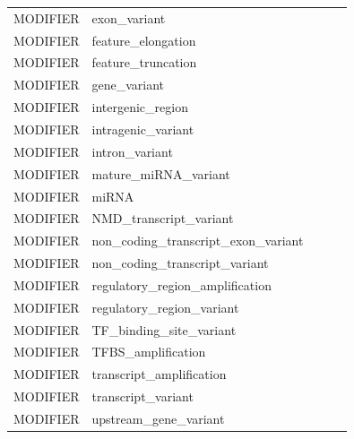 \begin{table}[]
{\begin{tabular}{|l|l|lll}
MODIFIER                       & exon\_variant                                        &  &  &  \\ \cline{1-2}
MODIFIER                       & feature\_elongation                                  &  &  &  \\ \cline{1-2}
MODIFIER                       & feature\_truncation                                  &  &  &  \\ \cline{1-2}
MODIFIER                       & gene\_variant                                        &  &  &  \\ \cline{1-2}
MODIFIER                       & intergenic\_region                                   &  &  &  \\ \cline{1-2}
MODIFIER                       & intragenic\_variant                                  &  &  &  \\ \cline{1-2}
MODIFIER                       & intron\_variant                                      &  &  &  \\ \cline{1-2}
MODIFIER                       & mature\_miRNA\_variant                               &  &  &  \\ \cline{1-2}
MODIFIER                       & miRNA                                                &  &  &  \\ \cline{1-2}
MODIFIER                       & NMD\_transcript\_variant                             &  &  &  \\ \cline{1-2}
MODIFIER                       & non\_coding\_transcript\_exon\_variant               &  &  &  \\ \cline{1-2}
MODIFIER                       & non\_coding\_transcript\_variant                     &  &  &  \\ \cline{1-2}
MODIFIER                       & regulatory\_region\_amplification                    &  &  &  \\ \cline{1-2}
MODIFIER                       & regulatory\_region\_variant                          &  &  &  \\ \cline{1-2}
MODIFIER                       & TF\_binding\_site\_variant                           &  &  &  \\ \cline{1-2}
MODIFIER                       & TFBS\_amplification                                  &  &  &  \\ \cline{1-2}
MODIFIER                       & transcript\_amplification                            &  &  &  \\ \cline{1-2}
MODIFIER                       & transcript\_variant                                  &  &  &  \\ \cline{1-2}
MODIFIER                       & upstream\_gene\_variant                              &  &  &  \\ \cline{1-2}
\end{tabular}
}
\end{table}

